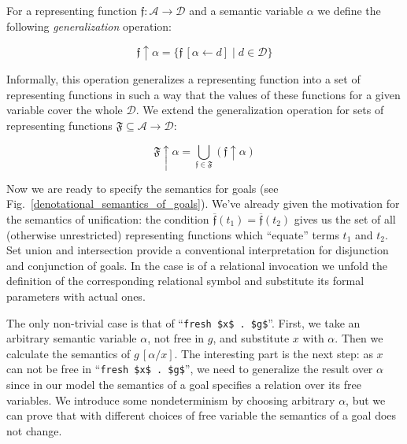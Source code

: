 
For a representing function $\mathfrak{f}:\mathcal{A}\to\mathcal{D}$ and a semantic variable $\alpha$ we define
the following \emph{generalization} operation:

\[
\mathfrak{f}\uparrow\alpha = \{ \mathfrak{f}\,[\alpha\gets d] \mid d\in\mathcal D\}
\]

Informally, this operation generalizes a representing function into a set of representing functions in such a way that the
values of these functions for a given variable cover the whole $\mathcal{D}$. We extend the generalization operation for sets of
representing functions $\mathfrak{F}\subseteq\mathcal{A}\to\mathcal{D}$:

\[
  \mathfrak{F}\uparrow\alpha = \bigcup_{\mathfrak{f}\in\mathfrak{F}}(\mathfrak{f}\uparrow\alpha)
\]

Now we are ready to specify the semantics for goals (see Fig.~\ref{denotational_semantics_of_goals}).
We've already given the motivation for
the semantics of unification: the condition $\overline{\mathfrak{f}}(t_1)=\overline{\mathfrak{f}}(t_2)$ gives us the set of all (otherwise
  unrestricted) representing functions which ``equate'' terms $t_1$ and $t_2$.
  Set union and intersection provide a conventional interpretation
for disjunction and conjunction of goals. In the case is of a relational invocation we unfold the definition of the corresponding
relational symbol and substitute its formal parameters with actual ones.

The only non-trivial case is that of ``\lstinline|fresh $x$ . $g$|''. First, we take an arbitrary semantic variable $\alpha$,
not free in $g$, and substitute $x$ with $\alpha$. Then we calculate the semantics of $g\,[\alpha/x]$. The interesting part is the next step:
as $x$ can not be free in ``\lstinline|fresh $x$ . $g$|'', we need to generalize the result over $\alpha$ since in our model the semantics of a
goal specifies a relation over its free variables. We introduce some nondeterminism by choosing arbitrary $\alpha$, but we can prove that with different
choices of free variable the semantics of a goal does not change.

